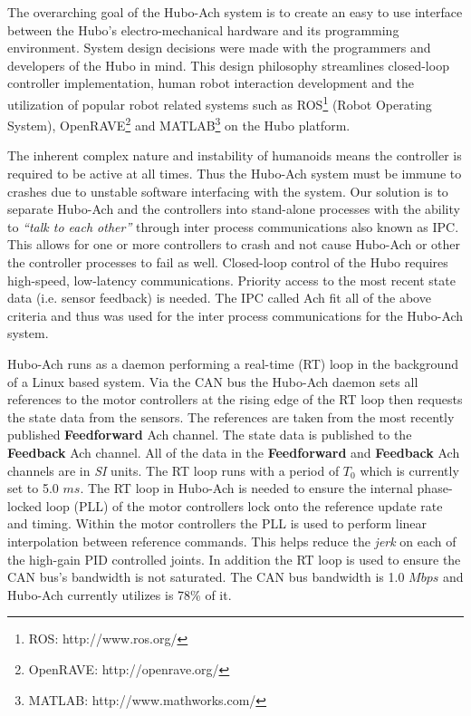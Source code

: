The overarching goal of the Hubo-Ach system is to create an easy to use interface between the Hubo's electro-mechanical hardware and its programming environment.  
System design decisions were made with the programmers and developers of the Hubo in mind.
This design philosophy streamlines closed-loop controller implementation, human robot interaction development and the utilization of popular robot related systems such as ROS\footnote{ROS: http://www.ros.org/} (Robot Operating System), OpenRAVE\footnote{OpenRAVE: http://openrave.org/} and MATLAB\footnote{MATLAB: http://www.mathworks.com/} on the Hubo platform.

The inherent complex nature and instability of humanoids means the controller is required to be active at all times.
Thus the Hubo-Ach system must be immune to crashes due to unstable software interfacing with the system.
Our solution is to separate Hubo-Ach and the controllers into stand-alone processes with the ability to \textit{``talk to each other''} through inter process communications also known as IPC.
This allows for one or more controllers to crash and not cause Hubo-Ach or other the controller processes to fail as well.
Closed-loop control of the Hubo requires high-speed, low-latency communications.
Priority access to the most recent state data (i.e. sensor feedback) is needed.
The IPC called Ach \cite{ach} fit all of the above criteria and thus was used for the inter process communications for the Hubo-Ach system.

Hubo-Ach runs as a daemon performing a real-time (RT) loop in the background of a Linux based system.
Via the CAN bus the Hubo-Ach daemon sets all references to the motor controllers at the rising edge of the RT loop then requests the state data from the sensors.
The references are taken from the most recently published \textbf{Feedforward} Ach channel.
The state data is published to the \textbf{Feedback} Ach channel.
All of the data in the \textbf{Feedforward} and \textbf{Feedback} Ach channels are in \textit{SI} units.
The RT loop runs with a period of $T_0$ which is currently set to 5.0 $ms$.
The RT loop in Hubo-Ach is needed to ensure the internal phase-locked loop (PLL) of the motor controllers lock onto the reference update rate and timing.
Within the motor controllers the PLL is used to perform linear interpolation between reference commands.
This helps reduce the \textit{jerk} on each of the high-gain PID controlled joints.
In addition the RT loop is used to ensure the CAN bus's bandwidth is not saturated.
The CAN bus bandwidth is 1.0 $Mbps$ and Hubo-Ach currently utilizes is 78\% of it.

